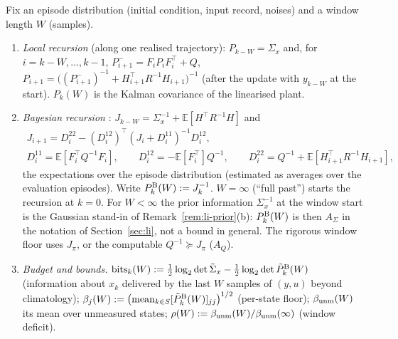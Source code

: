 \begin{definition}\label{def:m4-budget}
Fix an episode distribution (initial condition, input record, noises) and a window length $W$ (samples).
\begin{enumerate}
\item[(i)] \emph{Local recursion} (along one realised trajectory): $P_{k-W}=\Sigma_x$ and, for $i=k-W,\dots,k-1$,
$P^-_{i+1}=F_iP_iF_i^\top+Q$, $P_{i+1}=\big((P^-_{i+1})^{-1}+H_{i+1}^\top R^{-1}H_{i+1}\big)^{-1}$ (after the update
with $y_{k-W}$ at the start). $P_k(W)$ is the Kalman covariance of the linearised plant.
\item[(ii)] \emph{Bayesian recursion} \citep{tichavsky1998posterior}: $J_{k-W}=\Sigma_x^{-1}+\mathbb E[H^\top R^{-1}H]$
and
\begin{gather*}
J_{i+1}=D^{22}_i-(D^{12}_i)^\top(J_i+D^{11}_i)^{-1}D^{12}_i,\\
D^{11}_i=\mathbb E[F_i^\top Q^{-1}F_i],\qquad D^{12}_i=-\mathbb E[F_i^\top]Q^{-1},\qquad D^{22}_i=Q^{-1}+\mathbb E[H_{i+1}^\top R^{-1}H_{i+1}],
\end{gather*}
the expectations over the episode distribution (estimated as averages over the evaluation episodes). Write
$P^{\rm B}_k(W):=J_k^{-1}$. $W=\infty$ (``full past'') starts the recursion at $k=0$.  For
$W<\infty$ the prior information $\Sigma_x^{-1}$ at the window start is the Gaussian stand-in of
Remark~\ref{rem:li-prior}(b): $P^{\rm B}_k(W)$ is then $A_\Sigma$ in the notation of Section~\ref{sec:li}, not a bound in
general. The rigorous window floor uses $J_\pi$, or the computable $Q^{-1}\succeq J_\pi$ ($A_Q$).
\item[(iii)] \emph{Budget and bounds.} $\mathrm{bits}_k(W):=\tfrac12\log_2\det\tilde\Sigma_x-\tfrac12\log_2\det\tilde P^{\rm B}_k(W)$
(information about $x_k$ delivered by the last $W$ samples of $(y,u)$ beyond climatology);
$\beta_j(W):=\big(\mathrm{mean}_{k\in S}[\tilde P^{\rm B}_k(W)]_{jj}\big)^{1/2}$ (per-state floor);
$\beta_{\rm unm}(W)$ its mean over unmeasured states; $\rho(W):=\beta_{\rm unm}(W)/\beta_{\rm unm}(\infty)$ (window deficit).
\end{enumerate}
\end{definition}

